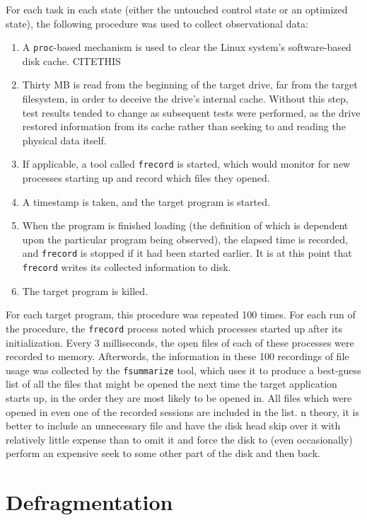 \documentclass[10pt,twocolumn,letterpaper]{article}
\begin{document}
For each task in each state (either the untouched control state or an optimized state), the
following procedure was used to collect observational data:
\begin{enumerate}
\item A \texttt{proc}-based mechanism is used to clear the Linux system's software-based disk cache. CITETHIS
\item Thirty MB is read from the beginning of the target drive, far from the target filesystem, in order to deceive the drive's internal cache. Without this step, test results tended to change as subsequent tests were performed, as the drive restored information from its cache rather than seeking to and reading the physical data itself.
\item If applicable, a tool called \texttt{frecord} is started, which would monitor for new processes starting up and record which
files they opened.
\item A timestamp is taken, and the target program is started.
\item When the program is finished loading (the definition of which is dependent upon the particular program being observed), the elapsed time is recorded, and \texttt{frecord} is stopped if it had been started earlier. It is at this
point that \texttt{frecord} writes its collected information to disk.
\item The target program is killed.
\end{enumerate}

For each target program, this procedure was repeated 100 times. For each run of the procedure, the \texttt{frecord}
process noted which processes started up after its initialization. Every 3 milliseconds, the open files of each
of these processes were recorded to memory. Afterwords, the information in these 100 recordings of file usage
was collected by the \texttt{fsummarize} tool, which uses it to produce a best-guess list of all the files
that might be opened the next time the target application starts up, in the order they are most likely to be
opened in. All files which were opened in even one of the recorded sessions are included in the list. n theory,
it is better to include an unnecessary file and have the disk head skip over it with relatively little expense than to omit it and force the disk to (even occasionally) perform an expensive seek to some other part of the disk
and then back.

\section{Defragmentation}
\end{document}
